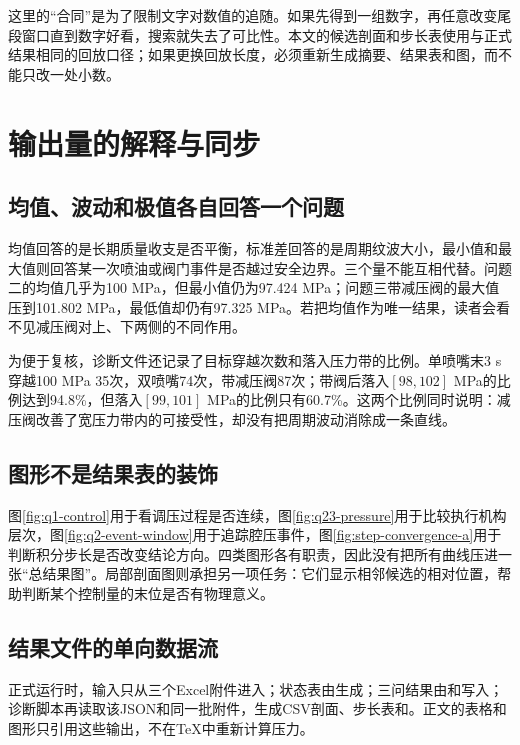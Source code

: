 \documentclass[UTF8,11pt,a4paper]{ctexart}
\begin{document}
这里的“合同”是为了限制文字对数值的追随。如果先得到一组数字，再任意改变尾段窗口直到数字好看，搜索就失去了可比性。本文的候选剖面和步长表使用与正式结果相同的回放口径；如果更换回放长度，必须重新生成摘要、结果表和图，而不能只改一处小数。

\section{输出量的解释与同步}

\subsection{均值、波动和极值各自回答一个问题}

均值回答的是长期质量收支是否平衡，标准差回答的是周期纹波大小，最小值和最大值则回答某一次喷油或阀门事件是否越过安全边界。三个量不能互相代替。问题二的均值几乎为100 MPa，但最小值仍为97.424 MPa；问题三带减压阀的最大值压到101.802 MPa，最低值却仍有97.325 MPa。若把均值作为唯一结果，读者会看不见减压阀对上、下两侧的不同作用。

为便于复核，诊断文件还记录了目标穿越次数和落入压力带的比例。单喷嘴末3 s穿越100 MPa 35次，双喷嘴74次，带减压阀87次；带阀后落入$[98,102]$ MPa的比例达到94.8\%，但落入$[99,101]$ MPa的比例只有60.7\%。这两个比例同时说明：减压阀改善了宽压力带内的可接受性，却没有把周期波动消除成一条直线。

\subsection{图形不是结果表的装饰}

图\ref{fig:q1-control}用于看调压过程是否连续，图\ref{fig:q23-pressure}用于比较执行机构层次，图\ref{fig:q2-event-window}用于追踪腔压事件，图\ref{fig:step-convergence-a}用于判断积分步长是否改变结论方向。四类图形各有职责，因此没有把所有曲线压进一张“总结果图”。局部剖面图则承担另一项任务：它们显示相邻候选的相对位置，帮助判断某个控制量的末位是否有物理意义。

\subsection{结果文件的单向数据流}

正式运行时，输入只从三个Excel附件进入；状态表由生成；三问结果由和写入；诊断脚本再读取该JSON和同一批附件，生成CSV剖面、步长表和。正文的表格和图形只引用这些输出，不在TeX中重新计算压力。
\end{document}
